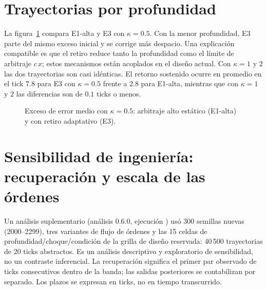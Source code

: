\section{Trayectorias por profundidad}

La figura~\ref{fig:prof} compara E1-alta y E3 con $\kappa=0.5$. Con la menor profundidad, E3 parte del mismo exceso inicial y se corrige más despacio. Una explicación compatible es que el retiro reduce tanto la profundidad como el límite de arbitraje $c\,x$; estos mecanismos están acoplados en el diseño actual. Con $\kappa=1$ y $2$ las dos trayectorias son casi idénticas. El retorno sostenido ocurre en promedio en el tick $7.8$ para E3 con $\kappa=0.5$ frente a $2.8$ para E1-alta, mientras que con $\kappa=1$ y $2$ las diferencias son de $0.1$ ticks o menos.

\begin{figure}[htbp]
\centering
{}
\caption{Exceso de error medio con $\kappa=0.5$: arbitraje alto estático (E1-alta) y con retiro adaptativo (E3).}
\label{fig:prof}
\end{figure}

\section{Sensibilidad de ingeniería: recuperación y escala de las órdenes}
\label{sec:engineering-sensitivity}

Un análisis suplementario (análisis 0.6.0, ejecución \code{\EngineeringRunID}) usó 300 semillas nuevas (2000--2299), tres variantes de flujo de órdenes y las 15 celdas de profundidad/choque/condición de la grilla de diseño reservada: 40\,500 trayectorias de 20 ticks abstractos. Es un análisis descriptivo y exploratorio de sensibilidad, no un contraste inferencial. La recuperación significa el primer par observado de ticks consecutivos dentro de la banda; las salidas posteriores se contabilizan por separado. Los plazos se expresan en ticks, no en tiempo transcurrido.

